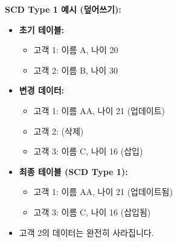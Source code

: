 \documentclass[11pt,a4paper]{article}
\theoremstyle{definition}
\begin{document}
\begin{examplebox}
\textbf{SCD Type 1 예시 (덮어쓰기):}
\begin{itemize}
    \item \textbf{초기 테이블:}
        \begin{itemize}
            \item 고객 1: 이름 A, 나이 20
            \item 고객 2: 이름 B, 나이 30
        \end{itemize}
    \item \textbf{변경 데이터:}
        \begin{itemize}
            \item 고객 1: 이름 AA, 나이 21 (업데이트)
            \item 고객 2: (삭제)
            \item 고객 3: 이름 C, 나이 16 (삽입)
        \end{itemize}
    \item \textbf{최종 테이블 (SCD Type 1):}
        \begin{itemize}
            \item 고객 1: 이름 AA, 나이 21 (업데이트됨)
            \item 고객 3: 이름 C, 나이 16 (삽입됨)
        \end{itemize}
    \item 고객 2의 데이터는 완전히 사라집니다.
\end{itemize}


\end{examplebox}
\end{document}
